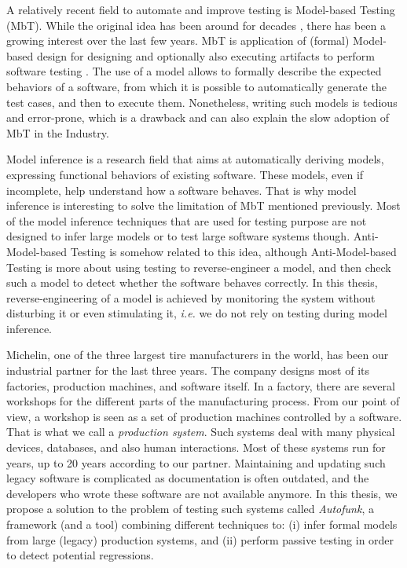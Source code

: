 A relatively recent field to automate and improve testing is
Model-based Testing (MbT). While the original idea has been
around for decades \cite{moore56}, there has been a growing
interest over the last few years.  MbT is application of (formal)
Model-based design for designing and optionally also executing
artifacts to perform software testing
\cite{Jorgensen:1995:STC:526521}. The
use of a model allows to formally describe the expected behaviors
of a software, from which it is possible to automatically
generate the test cases, and then to execute them.  Nonetheless,
writing such models is tedious and error-prone, which is a
drawback and can also explain the slow adoption of MbT in the
Industry.

Model inference is a research field that aims at automatically
deriving models, expressing functional behaviors of existing
software. These models, even if incomplete, help
understand how a software behaves. That is why model inference is
interesting to solve the limitation of MbT mentioned previously.
Most of the model inference techniques that are used for testing
purpose are not designed to infer large models or to test large
software systems though. Anti-Model-based Testing \cite{antimbt} is
somehow related to this idea, although Anti-Model-based Testing
is more about using testing to reverse-engineer a model, and then
check such a model to detect whether the software behaves
correctly. In this thesis, reverse-engineering of a model is
achieved by monitoring the system without disturbing it or even
stimulating it, \emph{i.e.} we do not rely on testing during model
inference.

Michelin, one of the three largest tire manufacturers in the
world, has been our industrial partner for the last three years.
The company designs most of its factories, production machines,
and software itself. In a factory, there are several workshops
for the different parts of the manufacturing process. From our
point of view, a workshop is seen as a set of production machines
controlled by a software. That is what we call a \emph{production
system}. Such systems deal with many physical devices, databases,
and also human interactions. Most of these systems run for years,
up to 20 years according to our partner. Maintaining and updating
such legacy software is complicated as documentation is often
outdated, and the developers who wrote these software are not
available anymore.  In this thesis, we propose a solution to the
problem of testing such systems called \textit{Autofunk}, a
framework (and a tool) combining different techniques to: (i)
infer formal models from large (legacy) production systems, and
(ii) perform passive testing in order to detect potential
regressions.


